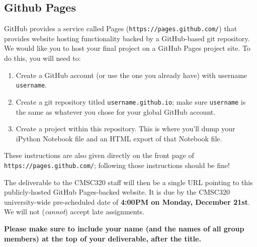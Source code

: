 \documentclass[11pt]{article}
\begin{document}
\subsection{Github Pages}
GitHub provides a service called Pages (\texttt{https://pages.github.com/}) that provides website hosting functionality backed by a GitHub-based git repository.  We would like you to host your final project on a GitHub Pages project site.  To do this, you will need to:
\begin{enumerate}
\item Create a GitHub account (or use the one you already have) with username \texttt{username}.
\item Create a git repository titled \texttt{username.github.io}; make sure \texttt{username} is the same as whatever you chose for your global GitHub account.
\item Create a project within this repository.  This is where you'll dump your iPython Notebook file and an HTML export of that Notebook file.  
\end{enumerate}
These instructions are also given directly on the front page of \texttt{https://pages.github.com/}; following those instructions should be fine!

The deliverable to the CMSC320 staff will then be a single URL pointing to this publicly-hosted GitHub Pages-backed website.  It is due by the CMSC320 university-wide pre-scheduled date of \textbf{4:00PM on Monday, December 21st}.  We will not (\emph{cannot}) accept late assignments.

\noindent\textbf{Please make sure to include your name (and the names of all group members) at the top of your deliverable, after the title.}
\end{document}
